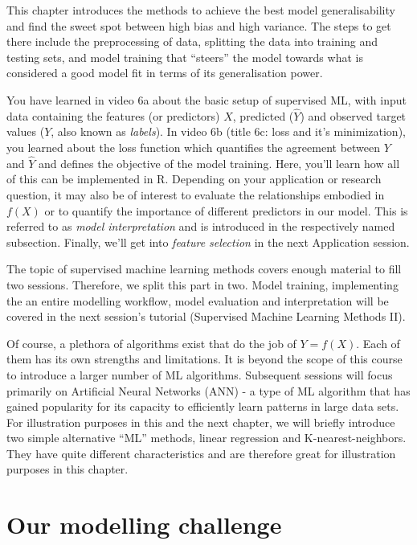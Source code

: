 \documentclass[
]{book}
\begin{document}
This chapter introduces the methods to achieve the best model generalisability and find the sweet spot between high bias and high variance. The steps to get there include the preprocessing of data, splitting the data into training and testing sets, and model training that ``steers'' the model towards what is considered a good model fit in terms of its generalisation power.

You have learned in video 6a about the basic setup of supervised ML, with input data containing the features (or predictors) \(X\), predicted (\(\hat{Y}\)) and observed target values (\(Y\), also known as \emph{labels}). In video 6b (title 6c: loss and it's minimization), you learned about the loss function which quantifies the agreement between \(Y\) and \(\hat{Y}\) and defines the objective of the model training. Here, you'll learn how all of this can be implemented in R. Depending on your application or research question, it may also be of interest to evaluate the relationships embodied in \(f(X)\) or to quantify the importance of different predictors in our model. This is referred to as \emph{model interpretation} and is introduced in the respectively named subsection. Finally, we'll get into \emph{feature selection} in the next Application session.

The topic of supervised machine learning methods covers enough material to fill two sessions. Therefore, we split this part in two. Model training, implementing the an entire modelling workflow, model evaluation and interpretation will be covered in the next session's tutorial (Supervised Machine Learning Methods II).

Of course, a plethora of algorithms exist that do the job of \(Y = f(X)\). Each of them has its own strengths and limitations. It is beyond the scope of this course to introduce a larger number of ML algorithms. Subsequent sessions will focus primarily on Artificial Neural Networks (ANN) - a type of ML algorithm that has gained popularity for its capacity to efficiently learn patterns in large data sets. For illustration purposes in this and the next chapter, we will briefly introduce two simple alternative ``ML'' methods, linear regression and K-nearest-neighbors. They have quite different characteristics and are therefore great for illustration purposes in this chapter.

\hypertarget{our-modelling-challenge}{%
\section{Our modelling challenge}\label{our-modelling-challenge}}
\end{document}
